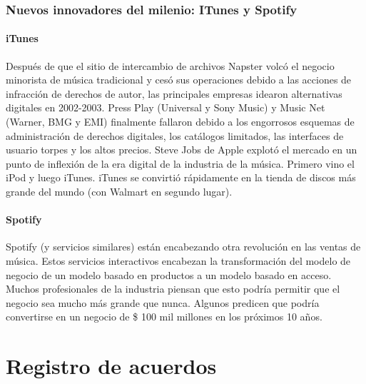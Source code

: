 \documentclass[10pt]{book}
\begin{document}
\subsection{Nuevos innovadores del milenio: ITunes y Spotify}
\subsubsection{iTunes}
Después de que el sitio de intercambio de archivos Napster volcó el negocio minorista de música tradicional y cesó sus operaciones debido a las acciones de infracción de derechos de autor, las principales empresas idearon alternativas digitales en 2002-2003. Press Play (Universal y Sony Music) y Music Net (Warner, BMG y EMI) finalmente fallaron debido a los engorrosos esquemas de administración de derechos digitales, los catálogos limitados, las interfaces de usuario torpes y los altos precios. Steve Jobs de Apple explotó el mercado en un punto de inflexión de la era digital de la industria de la música. Primero vino el iPod y luego iTunes. iTunes se convirtió rápidamente en la tienda de discos más grande del mundo (con Walmart en segundo lugar).
\subsubsection{Spotify}
Spotify (y servicios similares) están encabezando otra revolución en las ventas de música. Estos servicios interactivos encabezan la transformación del modelo de negocio de un modelo basado en productos a un modelo basado en acceso. Muchos profesionales de la industria piensan que esto podría permitir que el negocio sea mucho más grande que nunca. Algunos predicen que podría convertirse en un negocio de \$ 100 mil millones en los próximos 10 años.

\chapter{Registro de acuerdos}
\end{document}
